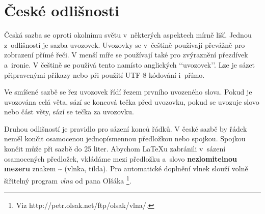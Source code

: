 \documentclass[11pt,twocolumn]{article}
\begin{document}
\section{České odlišnosti}
Česká sazba se oproti okolnímu světu v~některých aspektech mírně liší. Jednou z~odlišností je sazba uvozovek. Uvozovky se v~češtině používají převážně pro zobrazení přímé řeči. V menší míře se používají také pro zvýraznění přezdívek a~ironie. V češtině se používá tento \textbf{} namísto anglických ‘‘uvozovek’’. Lze je sázet připravenými příkazy nebo při použití UTF-8 kódování i~přímo.
\par
Ve smíšené sazbě se řez uvozovek řídí řezem prvního uvozeného slova. Pokud je uvozována celá věta, sází se koncová tečka před uvozovku, pokud se uvozuje slovo nebo část věty, sází se tečka za uvozovku.
\par
Druhou odlišností je pravidlo pro sázení konců řádků. V české sazbě by řádek neměl končit osamocenou jednopísmennou předložkou nebo spojkou. Spojkou  končit může při sazbě do 25 liter. Abychom \LaTeX u zabránili v~sázení osamocených předložek, vkládáme mezi předložku a~slovo \textbf{nezlomitelnou mezeru} znakem \~{} (vlnka, tilda). Pro automatické doplnění vlnek slouží volně šiřitelný program \emph{vlna} od pana Olšáka \footnote{Viz http://petr.olsak.net/ftp/olsak/vlna/.}.
\end{document}
